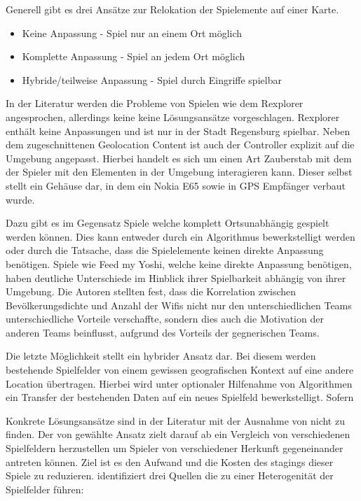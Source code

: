 Generell gibt es drei Ansätze zur Relokation der Spielemente auf einer Karte.

\begin{itemize}
      \item Keine Anpassung - Spiel nur an einem Ort möglich
      \item Komplette Anpassung - Spiel an jedem Ort möglich
      \item Hybride/teilweise Anpassung - Spiel durch Eingriffe spielbar
\end{itemize}

In der Literatur werden die Probleme von Spielen wie dem Rexplorer\cite{Ballagas.2007} angesprochen, allerdings keine keine Lösungsansätze vorgeschlagen. Rexplorer enthält keine Anpassungen und ist nur in der Stadt Regensburg spielbar. Neben dem zugeschnittenen Geolocation Content ist auch der Controller explizit auf die Umgebung angepasst.
Hierbei handelt es sich um einen Art Zauberstab mit dem der Spieler mit den Elementen in der Umgebung interagieren kann. Dieser selbst stellt ein Gehäuse dar, in dem ein Nokia E65  sowie in GPS Empfänger verbaut wurde.

Dazu gibt es im Gegensatz Spiele welche komplett Ortsunabhängig gespielt werden können.
Dies kann entweder durch ein Algorithmus bewerkstelligt werden oder durch die Tatsache, dass die Spielelemente keinen direkte Anpassung benötigen.
Spiele wie Feed my Yoshi, welche keine direkte Anpassung benötigen, haben deutliche Unterschiede im Hinblick ihrer Spielbarkeit abhängig von ihrer Umgebung. Die Autoren stellten fest, dass die Korrelation zwischen Bevölkerungsdichte und Anzahl der Wifis nicht nur den unterschiedlichen Teams unterschiedliche Vorteile verschaffte, sondern dies auch die Motivation der anderen Teams beinflusst, aufgrund des Vorteils der gegnerischen Teams.

Die letzte Möglichkeit stellt ein hybrider Ansatz dar. Bei diesem werden bestehende Spielfelder von einem gewissen geografischen Kontext auf eine andere Location übertragen. Hierbei wird unter optionaler Hilfenahme von Algorithmen ein Transfer der bestehenden Daten auf ein neues Spielfeld bewerkstelligt. Sofern

Konkrete Lösungsansätze sind in der Literatur mit der Ausnahme von \cite{Kiefer.2007}
nicht zu finden.
Der von \cite{Kiefer.2007} gewählte Ansatz zielt darauf ab ein Vergleich von verschiedenen Spielfeldern herzustellen um Spieler von verschiedener Herkunft gegeneinander antreten können. Ziel ist es den Aufwand und die Kosten des stagings dieser Spiele zu reduzieren. \citep{Kiefer.2007} identifiziert drei Quellen die zu einer Heterogenität der Spielfelder führen:

